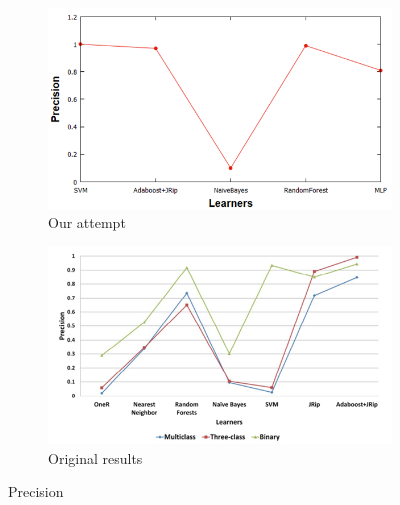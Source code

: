 \begin{figure}[H]
    \centering
    \begin{subfigure}[t]{0.5\textwidth}
        \includegraphics[width=\linewidth]{images/weka_precision.png}
        \caption{Our attempt}
    \end{subfigure}%
    \begin{subfigure}[t]{0.5\textwidth}
        \includegraphics[width=\linewidth]{images/weka_precision_cite.png}
        \caption{Original results \cite{borges_hink_machine_2014-1}}
    \end{subfigure}
    \caption{Precision}
\end{figure}

